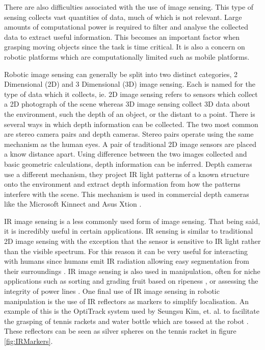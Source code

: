 There are also difficulties associated with the use of image sensing. This type of sensing collects vast quantities of data, much of which is not relevant. Large amounts of computational power is required to filter and analyse the collected data to extract useful information. This becomes an important factor when grasping moving objects since the task is time critical. It is also a concern on robotic platforms which are computationally limited such as mobile platforms.

Robotic image sensing can generally be split into two distinct categories, 2 Dimensional (2D) and 3 Dimensional (3D) image sensing. Each is named for the type of data which it collects, ie. 2D image sensing refers to sensors which collect a 2D photograph of the scene whereas 3D image sensing collect 3D data about the environment, such the depth of an object, or the distant to a point. There is several ways in which depth information can be collected. The two most common are stereo camera pairs and depth cameras. Stereo pairs operate using the same mechanism as the human eyes. A pair of traditional 2D image sensors are placed a know distance apart. Using difference between the two images collected and basic geometric calculations, depth information can be inferred. Depth cameras use a different mechanism, they project IR light patterns of a known structure onto the environment and extract depth information from how the patterns interfere with the scene. This mechanism is used in commercial depth cameras like the Microsoft Kinnect and Asus Xtion \cite{APCinhandproxandcontact}.

IR image sensing is a less commonly used form of image sensing. That being said, it is incredibly useful in certain applications. IR sensing is similar to traditional 2D image sensing with the exception that the sensor is sensitive to IR light rather than the visible spectrum. For this reason it can be very useful for interacting with humans since humans emit IR radiation allowing easy segmentation from their surroundings \cite{HumanIR}. IR image sensing is also used in manipulation, often for niche applications such as sorting and grading fruit based on ripeness \cite{MangoTest}, or assessing the integrity of power lines \cite{IRPowerLines}. One final use of IR image sensing in robotic manipulation is the use of IR reflectors as markers to simplify localisation. An example of this is the OptiTrack system \cite{OptiTrack} used by Seungsu Kim, et. al. to facilitate the grasping of tennis rackets and water bottle which are tossed at the robot \cite{TennisRacket}. These reflectors can be seen as silver spheres on the tennis racket in figure \ref{fig:IRMarkers}.


